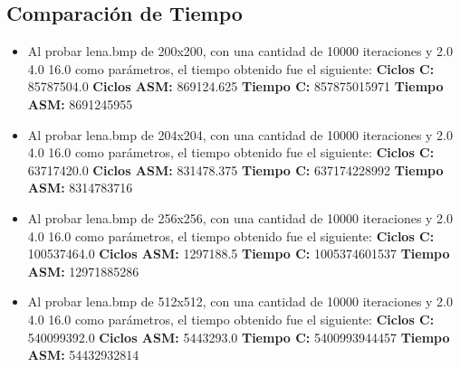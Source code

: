 \documentclass[10pt, a4paper]{article}
\begin{document}
\begin{itemize}
\subsection{Comparación de Tiempo}

\begin{itemize}
\item{Al probar lena.bmp de 200x200, con una cantidad de 10000 iteraciones y 2.0 4.0 16.0 como parámetros, el tiempo obtenido fue el siguiente:\newline
\newline
\textbf{Ciclos C:}                  85787504.0\newline
\vspace{0.15cm}
\textbf{Ciclos ASM:}               869124.625\newline
\textbf{Tiempo C:}                 857875015971\newline
\textbf{Tiempo ASM:}               8691245955\newline}

\item{Al probar lena.bmp de 204x204, con una cantidad de 10000 iteraciones y 2.0 4.0 16.0 como parámetros, el tiempo obtenido fue el siguiente:\newline
\newline
\textbf{Ciclos C:}                 63717420.0\newline
\vspace{0.15cm}
\textbf{Ciclos ASM:}               831478.375\newline
\textbf{Tiempo C:}                 637174228992\newline
\textbf{Tiempo ASM:}               8314783716\newline}

\item{Al probar lena.bmp de 256x256, con una cantidad de 10000 iteraciones y 2.0 4.0 16.0 como parámetros, el tiempo obtenido fue el siguiente:\newline
\newline
\textbf{Ciclos C:}                 100537464.0\newline
\vspace{0.15cm}
\textbf{Ciclos ASM:}               1297188.5\newline
\textbf{Tiempo C:}                 1005374601537\newline
\textbf{Tiempo ASM:}               12971885286\newline}


\item{Al probar lena.bmp de 512x512, con una cantidad de 10000 iteraciones y 2.0 4.0 16.0 como parámetros, el tiempo obtenido fue el siguiente:\newline
\newline
\textbf{Ciclos C:}                  540099392.0\newline
\vspace{0.15cm}
\textbf{Ciclos ASM:}               5443293.0\newline
\textbf{Tiempo C:}                 5400993944457\newline
\textbf{Tiempo ASM:}               54432932814\newline}



\end{itemize}
\end{itemize}
\end{document}
